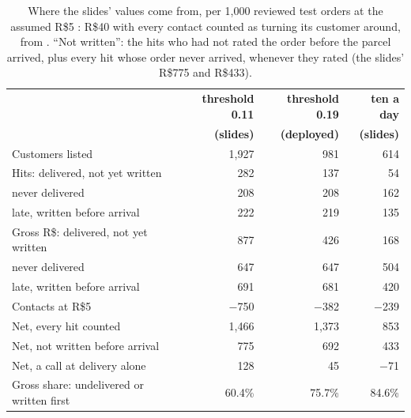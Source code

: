 \begin{table}[htbp]
\centering
\caption{Where the slides' values come from, per 1{,}000 reviewed test orders at
the assumed R\$5 : R\$40 with every contact counted as turning its customer
around, from . ``Not written'': the hits
who had not rated the order before the parcel arrived, plus every hit whose
order never arrived, whenever they rated (the slides' R\$775 and R\$433).}
\label{tab:decomp}
\footnotesize
\begin{tabular}{@{}lrrr@{}}
\toprule
 & \textbf{threshold 0.11} & \textbf{threshold 0.19} & \textbf{ten a day} \\
 & \textbf{(slides)} & \textbf{(deployed)} & \textbf{(slides)} \\
\midrule
Customers listed & 1{,}927 & 981 & 614 \\
Hits: delivered, not yet written & 282 & 137 & 54 \\
\quad never delivered & 208 & 208 & 162 \\
\quad late, written before arrival & 222 & 219 & 135 \\
\midrule
Gross R\$: delivered, not yet written & 877 & 426 & 168 \\
\quad never delivered & 647 & 647 & 504 \\
\quad late, written before arrival & 691 & 681 & 420 \\
Contacts at R\$5 & $-$750 & $-$382 & $-$239 \\
\midrule
Net, every hit counted & 1{,}466 & 1{,}373 & 853 \\
Net, not written before arrival & 775 & 692 & 433 \\
Net, a call at delivery alone & 128 & 45 & $-$71 \\
Gross share: undelivered or written first & 60.4\% & 75.7\% & 84.6\% \\
\bottomrule
\end{tabular}
\end{table}
